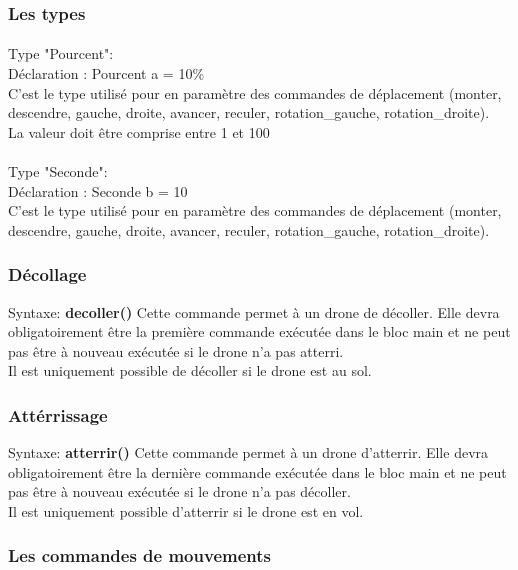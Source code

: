 \documentclass[12pt]{article}
\begin{document}
        \subsubsection{Les types}
      	\paragraph{}Type "Pourcent":\\
		Déclaration : Pourcent a = 10\%\\
		C'est le type utilisé pour en paramètre des commandes de déplacement (monter, descendre, gauche, droite, avancer, reculer, rotation\_gauche, rotation\_droite).\\
		La valeur doit être comprise entre 1 et 100
	\paragraph{}Type "Seconde": \\ 
		Déclaration : Seconde b = 10\\
		C'est le type utilisé pour en paramètre des commandes de déplacement (monter, descendre, gauche, droite, avancer, reculer, rotation\_gauche, rotation\_droite).\\
	\subsubsection{Décollage}
		\quad Syntaxe: \textbf{decoller()}\bigbreak
			Cette commande permet à un drone de décoller. Elle devra obligatoirement être la première commande exécutée dans le bloc main et ne peut pas être à nouveau exécutée si le drone n'a pas atterri.\\
			Il est uniquement possible de décoller si le drone est au sol. 
	\subsubsection{Attérrissage}

		\quad Syntaxe: \textbf{atterrir()}\bigbreak
			Cette commande permet à un drone d'atterrir. Elle devra obligatoirement être la dernière commande exécutée dans le bloc main et ne peut pas être à nouveau exécutée si le drone n'a pas décoller. \\
			Il est uniquement possible d'atterrir si le drone est en vol.

	\subsubsection{Les commandes de mouvements}
\end{document}
